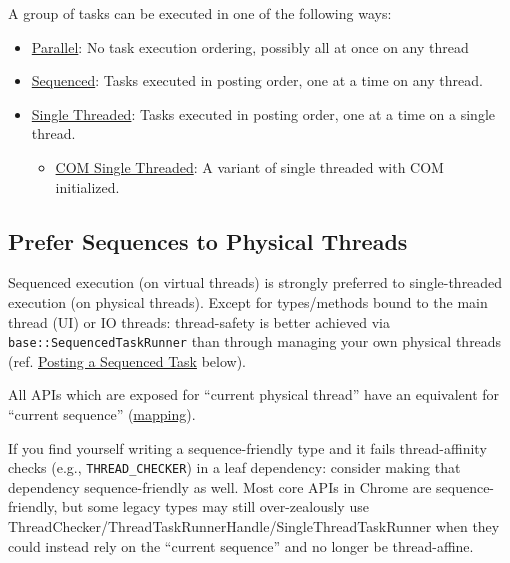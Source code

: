 \documentclass[a4paper,12pt,notitlepage,twoside,openright]{article}
\begin{document}
A group of tasks can be executed in one of the following ways:

\begin{itemize}
\item
  \protect\hyperlink{Posting-a-Parallel-Task}{Parallel}: No task
  execution ordering, possibly all at once on any thread
\item
  \protect\hyperlink{Posting-a-Sequenced-Task}{Sequenced}: Tasks
  executed in posting order, one at a time on any thread.
\item
  \protect\hyperlink{Posting-Multiple-Tasks-to-the-Same-Thread}{Single
  Threaded}: Tasks executed in posting order, one at a time on a single
  thread.

  \begin{itemize}
  \item
    \protect\hyperlink{Posting-Tasks-to-a-COM-Single_Thread-Apartment-STA_Thread-Windows}{COM
    Single Threaded}: A variant of single threaded with COM initialized.
  \end{itemize}
\end{itemize}

\hypertarget{prefer-sequences-to-physical-threads}{%
\subsection{Prefer Sequences to Physical
Threads}\label{prefer-sequences-to-physical-threads}}

Sequenced execution (on virtual threads) is strongly preferred to
single-threaded execution (on physical threads). Except for
types/methods bound to the main thread (UI) or IO threads: thread-safety
is better achieved via \texttt{base::SequencedTaskRunner} than through
managing your own physical threads (ref.
\protect\hyperlink{posting-a-sequenced-task}{Posting a Sequenced Task}
below).

All APIs which are exposed for ``current physical thread'' have an
equivalent for ``current sequence''
(\href{threading_and_tasks_faq.md\#How-to-migrate-from-SingleThreadTaskRunner-to-SequencedTaskRunner}{mapping}).

If you find yourself writing a sequence-friendly type and it fails
thread-affinity checks (e.g., \texttt{THREAD\_CHECKER}) in a leaf
dependency: consider making that dependency sequence-friendly as well.
Most core APIs in Chrome are sequence-friendly, but some legacy types
may still over-zealously use
ThreadChecker/ThreadTaskRunnerHandle/SingleThreadTaskRunner when they
could instead rely on the ``current sequence'' and no longer be
thread-affine.
\end{document}
